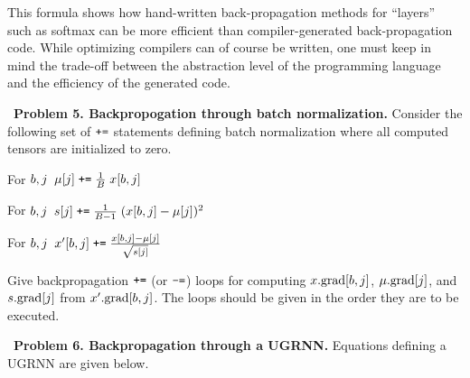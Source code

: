 \documentclass{article}
\newcommand{\solution}[1]{}
\begin{document}
\medskip
This formula shows how hand-written back-propagation methods for ``layers'' such as softmax
can be more efficient than compiler-generated back-propagation code.
While optimizing compilers can of course be written, one must keep in mind the trade-off
between the abstraction level of the programming language and the efficiency of the generated code.


\medskip
~{\bf Problem 5. Backpropogation through batch normalization.}
Consider the following set of $\mbox{\tt +=}$ statements defining batch normalization
where all computed tensors are initialized to zero.

\medskip
For $b,j \;\;\mu[j] \;\mbox{\tt +=}\; \frac{1}{B}\;x[b,j]$

\medskip
For $b,j\;\;s[j] \;\mbox{\tt +=}\; \frac{1}{B-1}\;(x[b,j] - \mu[j])^2$

\medskip
For $b,j\;\;x'[b,j] \;\mbox{\tt +=}\; \frac{x[b,j] - \mu[j]}{\sqrt{s[j]}}$

\medskip
Give backpropagation $\mbox{\tt +=}$ (or $\mbox{\tt -=}$) loops for computing $x.\mathrm{grad}[b,j]$, $\mu.\mathrm{grad}[j]$, and $s.\mathrm{grad}[j]$ from $x'.\mathrm{grad}[b,j]$.
The loops should be given in the order they are to be executed.

\medskip
\solution{

  $$\begin{array}{lrcl}

    \mbox{For}\;b,j & x.grad[b,j] &\pluseq & \frac{x'.\grad[b,j]}{\sqrt{s[j]}} \\
    \\
    \mbox{For}\; b,j & \mu.grad[j] &\minuseq & \frac{x'.\grad[b,j]}{\sqrt{s[j]}} \\
    \\
    \mbox{For}\; b,j & s.grad[j] &\minuseq & \frac{1}{2}(x[b,j] - \mu[j])s[j]^{-3/2}\;x'.grad[b,j] \\
    \\
    \mbox{For}\; b,j & x.grad[b,j] &\pluseq & \frac{2}{B-1}\;(x[b,j] - \mu[j])s.\grad[j] \\
    \\
    \mbox{For}\; b,j & \mu.\grad[j] &\minuseq & \frac{2}{B-1}\;(x[b,j] - \mu[j])s.\grad[j] \\
    \\
    \mbox{For}\; b,j & x.grad[b,j] &\pluseq & \frac{1}{B}\;\mu.\grad[j]
  \end{array}$$
}


\bigskip
~{\bf Problem 6. Backpropagation through a UGRNN.}
Equations defining a UGRNN are given below.
\end{document}
